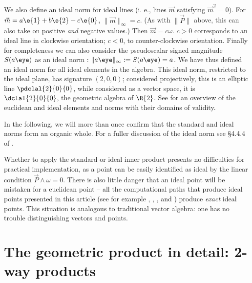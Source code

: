 \documentclass[12pt]{article}
\newcommand{\gTh}{\cite{gunnThesis}\xspace}
\begin{document}
We also define an ideal norm for ideal lines (i. e., lines $\vec{m}$ satisfying $\vec{m}^2 = 0$).  For $\vec{m} =  a \e{1} + b \e{2} + c\e{0}$, $\| \vec{m} \|_\infty = c$. (As with $\| \vec{P} \|$ above, this can also take on positive \emph{and} negative values.) Then $\vec{m} = c\omega$.  $c>0$ corresponds to an ideal line in clockwise orientation; $c<0$, to counter-clockwise orientation.  Finally for completeness we can also consider the pseudoscalar signed magnitude $S(a\eye)$ as an ideal norm%
: $\| a\eye \|_\infty := S(a\eye) = a$.  We have thus defined an ideal norm for all ideal elements in the algebra.  This ideal norm, restricted to the ideal plane, has signature $(2,0,0)$; considered projectively, this is an elliptic line $\pdclal{2}{0}{0}$, while considered as a vector space, it is $\dclal{2}{0}{0}$,  the geometric algebra of $\R{2}$.  See  for an overview of the euclidean and ideal elements and norms with their domains of validity.  

In the following, we will  more than once confirm that the standard and ideal norms form an organic whole. For a fuller discussion of the ideal norm see \S 4.4.4 of \gTh.   


Whether to apply the standard or ideal inner product  presents no difficulties for practical implementation, as a point can be easily identified as ideal by the linear condition $\vec{P} \wedge \omega = 0$. There is also little danger that an ideal point will be mistaken for a euclidean point -- all the computational paths that produce ideal points presented in this article (see for example , , , and  ) produce \emph{exact} ideal points. %
This situation is analogous to traditional vector algebra: one has no trouble distinguishing vectors and points. 

  
 \section{The geometric product in detail: 2-way products}
\label{sec:gpdetail}
 
\end{document}
